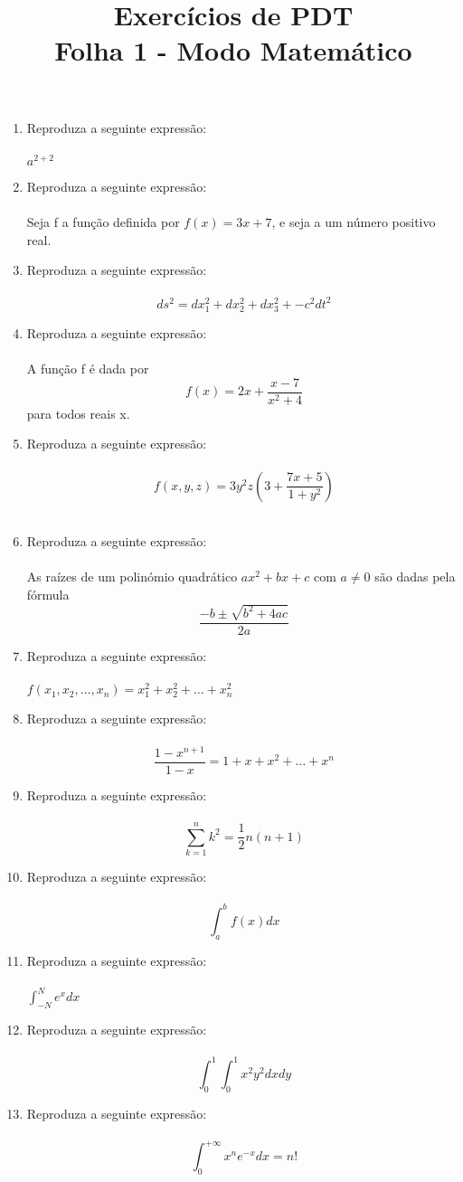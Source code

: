 \documentclass[12pt,a4paper]{article}
\title{Exercícios de PDT \\ Folha 1 - Modo Matemático}
\date{}
\begin{document}
\maketitle
\begin{enumerate}
\item Reproduza a seguinte expressão:\\
\\
$a^{2+2}$
\item Reproduza a seguinte expressão:\\
\\
Seja f a função definida por $f(x)=3x+7$, e seja a um número positivo real.\\
\item Reproduza a seguinte expressão:\\
\\
$$ds^2=dx_1^2+dx_2^2+dx_3^2+-c^{2}dt^2$$
\item Reproduza a seguinte expressão:\\
\\
A função f é dada por $$f(x)=2x+\frac{x-7}{x^2+4}$$ para todos reais x.
\item Reproduza a seguinte expressão:\\
\\
$$f(x,y,z)=3y^{2}z\left(3+\frac{7x+5}{1+y^2}\right)$$
\\
\item Reproduza a seguinte expressão:\\
\\
As raízes de um polinómio quadrático $ax^2+bx+c$ com $a\neq0$ são dadas pela fórmula $$\frac{-b\pm\sqrt{b^2+4ac}}{2a}$$
\item Reproduza a seguinte expressão:\\
\\
$f\left(x_1,x_2,\ldots,x_n\right)=x_1^2+x_2^2+\ldots+x_n^2$
\item Reproduza a seguinte expressão:\\
\\
$$\frac{1-x^{n+1}}{1-x}=1+x+x^2+\ldots+x^n$$
\item Reproduza a seguinte expressão:\\
\\
$$\sum_{k=1}^{n}k^2=\frac{1}{2}n(n+1)$$
\item Reproduza a seguinte expressão:\\
\\
$$\int_{a}^{b}f(x)dx$$
\item Reproduza a seguinte expressão:\\
\\
$\int_{-N}^{N}e^{x}dx$
\item Reproduza a seguinte expressão:\\
\\
$$\int_{0}^{1}\int_{0}^{1}x^{2}y^{2}dxdy$$
\item Reproduza a seguinte expressão:\\
\\
$$\int_{0}^{+\infty}x^{n}e^{-x}dx=n!$$
\end{enumerate}
\end{document}
